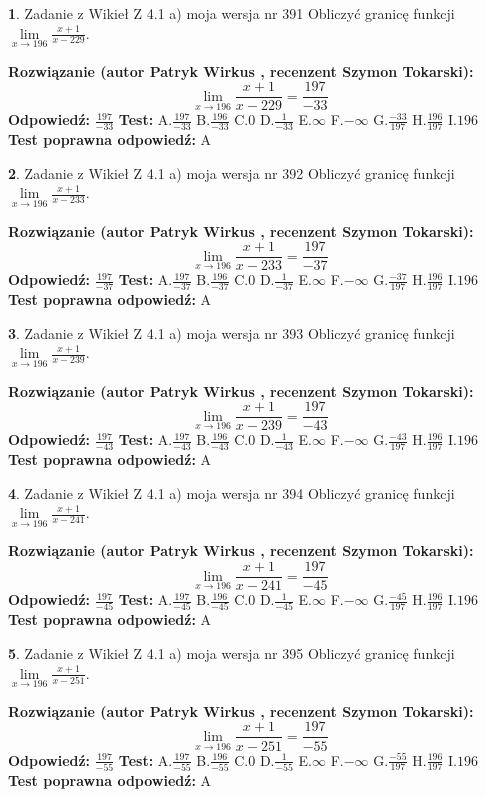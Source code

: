 \documentclass[12pt, a4paper]{article}
\theoremstyle{definition} %
\newtheorem{zad}{}
\newcommand{\zadStart}[1]{\begin{zad}#1\newline}
\newcommand{\zadStop}{\end{zad}}
\newcommand{\rozwStart}[2]{\noindent \textbf{Rozwiązanie (autor #1 , recenzent #2): }\newline}
\newcommand{\rozwStop}{\newline}
\newcommand{\odpStart}{\noindent \textbf{Odpowiedź:}\newline}
\newcommand{\odpStop}{\newline}
\newcommand{\testStart}{\noindent \textbf{Test:}\newline}
\newcommand{\testStop}{\newline}
\newcommand{\kluczStart}{\noindent \textbf{Test poprawna odpowiedź:}\newline}
\newcommand{\kluczStop}{\newline}
\begin{document}
\zadStart{Zadanie z Wikieł Z 4.1 a) moja wersja nr 391}
Obliczyć granicę funkcji $\lim\limits_{x\to196}\frac{x+1}{x-229}$.
\zadStop
\rozwStart{Patryk Wirkus}{Szymon Tokarski}
$$\lim\limits_{x\to196}\frac{x+1}{x-229} = \frac{197}{-33}$$
\rozwStop
\odpStart
$\frac{197}{-33}$
\odpStop
\testStart
A.$\frac{197}{-33}$
B.$\frac{196}{-33}$
C.$0$
D.$\frac{1}{-33}$
E.$\infty$
F.$-\infty$
G.$\frac{-33}{197}$
H.$\frac{196}{197}$
I.$196$
\testStop
\kluczStart
A
\kluczStop



\zadStart{Zadanie z Wikieł Z 4.1 a) moja wersja nr 392}
Obliczyć granicę funkcji $\lim\limits_{x\to196}\frac{x+1}{x-233}$.
\zadStop
\rozwStart{Patryk Wirkus}{Szymon Tokarski}
$$\lim\limits_{x\to196}\frac{x+1}{x-233} = \frac{197}{-37}$$
\rozwStop
\odpStart
$\frac{197}{-37}$
\odpStop
\testStart
A.$\frac{197}{-37}$
B.$\frac{196}{-37}$
C.$0$
D.$\frac{1}{-37}$
E.$\infty$
F.$-\infty$
G.$\frac{-37}{197}$
H.$\frac{196}{197}$
I.$196$
\testStop
\kluczStart
A
\kluczStop



\zadStart{Zadanie z Wikieł Z 4.1 a) moja wersja nr 393}
Obliczyć granicę funkcji $\lim\limits_{x\to196}\frac{x+1}{x-239}$.
\zadStop
\rozwStart{Patryk Wirkus}{Szymon Tokarski}
$$\lim\limits_{x\to196}\frac{x+1}{x-239} = \frac{197}{-43}$$
\rozwStop
\odpStart
$\frac{197}{-43}$
\odpStop
\testStart
A.$\frac{197}{-43}$
B.$\frac{196}{-43}$
C.$0$
D.$\frac{1}{-43}$
E.$\infty$
F.$-\infty$
G.$\frac{-43}{197}$
H.$\frac{196}{197}$
I.$196$
\testStop
\kluczStart
A
\kluczStop



\zadStart{Zadanie z Wikieł Z 4.1 a) moja wersja nr 394}
Obliczyć granicę funkcji $\lim\limits_{x\to196}\frac{x+1}{x-241}$.
\zadStop
\rozwStart{Patryk Wirkus}{Szymon Tokarski}
$$\lim\limits_{x\to196}\frac{x+1}{x-241} = \frac{197}{-45}$$
\rozwStop
\odpStart
$\frac{197}{-45}$
\odpStop
\testStart
A.$\frac{197}{-45}$
B.$\frac{196}{-45}$
C.$0$
D.$\frac{1}{-45}$
E.$\infty$
F.$-\infty$
G.$\frac{-45}{197}$
H.$\frac{196}{197}$
I.$196$
\testStop
\kluczStart
A
\kluczStop



\zadStart{Zadanie z Wikieł Z 4.1 a) moja wersja nr 395}
Obliczyć granicę funkcji $\lim\limits_{x\to196}\frac{x+1}{x-251}$.
\zadStop
\rozwStart{Patryk Wirkus}{Szymon Tokarski}
$$\lim\limits_{x\to196}\frac{x+1}{x-251} = \frac{197}{-55}$$
\rozwStop
\odpStart
$\frac{197}{-55}$
\odpStop
\testStart
A.$\frac{197}{-55}$
B.$\frac{196}{-55}$
C.$0$
D.$\frac{1}{-55}$
E.$\infty$
F.$-\infty$
G.$\frac{-55}{197}$
H.$\frac{196}{197}$
I.$196$
\testStop
\kluczStart
A
\kluczStop
\end{document}
